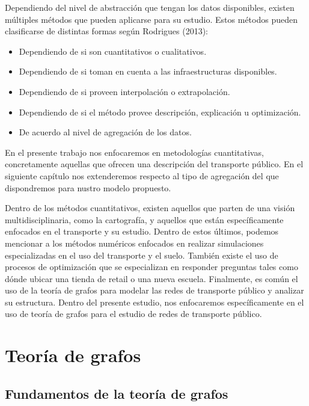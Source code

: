 \documentclass[11pt]{article}
\begin{document}
		Dependiendo del nivel de abstracción que tengan los datos disponibles, existen múltiples métodos que pueden aplicarse para su estudio. Estos métodos pueden clasificarse de distintas formas según Rodrigues (2013):
			\begin{itemize}
				\item Dependiendo de si son cuantitativos o cualitativos.
				\item Dependiendo de si toman en cuenta a las infraestructuras disponibles.
				\item Dependiendo de si proveen interpolación o extrapolación.
				\item Dependiendo de si el método provee descripción, explicación u optimización.
				\item De acuerdo al nivel de agregación de los datos.
			\end{itemize}

		En el presente trabajo nos enfocaremos en metodologías cuantitativas, concretamente aquellas que ofrecen una descripción del transporte público. En el siguiente capítulo nos extenderemos respecto al tipo de agregación del que dispondremos para nustro modelo propuesto.

		Dentro de los métodos cuantitativos, existen aquellos que parten de una visión multidisciplinaria, como la cartografía, y aquellos que están específicamente enfocados en el transporte y su estudio. Dentro de estos últimos, podemos mencionar a los métodos numéricos enfocados en realizar simulaciones especializadas en el uso del transporte y el suelo. También existe el uso de procesos de optimización que se especializan en responder preguntas tales como dónde ubicar una tienda de retail o una nueva escuela. Finalmente, es común el uso de la teoría de grafos para modelar las redes de transporte público y analizar su estructura. Dentro del presente estudio, nos enfocaremos específicamente en el uso de teoría de grafos para el estudio de redes de transporte público.

	\section{Teoría de grafos}

		\subsection{Fundamentos de la teoría de grafos}
\end{document}
